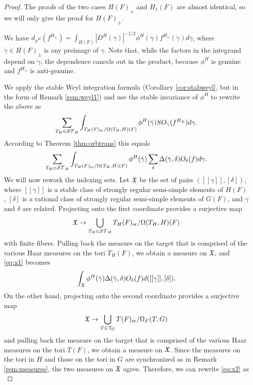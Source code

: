 \documentclass{article}
\theoremstyle{definition}
\numberwithin{equation}{section}
\renewcommand{\-}{\hyp{}}
\begin{document}
	\begin{proof}
	The proofs of the two cases $H(F)_\pm$ and $H_1(F)$ are almost identical, so we will only give the proof for $H(F)_\pm$.
	
	We have $d_{\phi^H}(f^{H_\pm}) = \int_{H(F)}|D^H(\gamma)|^{-1/2}\phi^H(\dot\gamma)f^{H_\pm}(\dot\gamma)d\gamma$, where $\dot\gamma \in H(F)_\pm$ is any preimage of $\gamma$. Note that, while the factors in the integrand depend on $\dot\gamma$, the dependence cancels out in the product, because $\phi^H$ is genuine and $f^{H_\pm}$ is anti-genuine.
	
	We apply the stable Weyl integration formula (Corollary \ref{cor:stabweyl}, but in the form of Remark \ref{rem:weyl1}) and use the stable invariance of $\phi^H$ to rewrite the above as
	\[ \sum_{T_H \in \mathcal{ST}_H} \int_{T_H(F)_{\textrm{sr}}/\Omega(T_H,H)(F)}\phi^H(\dot\gamma) SO_{\dot\gamma}(f^{H_\pm})d\gamma.\]
	According to Theorem \ref{thm:orbtrans} this equals
	\begin{equation} \label{eq:x1}
	\sum_{T_H \in \mathcal{ST}_H} \int_{T_H(F)_{\textrm{sr}}/\Omega(T_H,H)(F)}\phi^H(\dot\gamma)  \sum_\delta \Delta(\dot\gamma,\delta) O_\delta(f) d\gamma.
	\end{equation}
	We will now rework the indexing sets. Let $\mathfrak{X}$ be the set of pairs $([[\gamma]],[\delta])$, where $[[\gamma]]$ is a stable class of strongly regular semi-simple elements of $H(F)$, $[\delta]$ is a rational class of strongly regular semi-simple elements of $G(F)$, and $\gamma$ and $\delta$ are related. Projecting onto the first coordinate provides a surjective map
	\[ \mathfrak{X} \to \bigcup_{T_H \in \mathcal{ST}_H} T_H(F)_{\textrm{sr}}/\Omega(T_H,H)(F) \]
	with finite fibers. Pulling back the measure on the target that is comprised of the various Haar measures on the tori $T_H(F)$, we obtain a measure on $\mathfrak{X}$, and \eqref{eq:x1} becomes
	\begin{equation} \label{eq:x2}
	\int_{\mathfrak{X}} \phi^H(\dot\gamma) \Delta(\dot\gamma,\delta) O_\delta(f) d([[\gamma]],[\delta]).
	\end{equation}
	On the other hand, projecting onto the second coordinate provides a surjective map
	\[ \mathfrak{X} \to \bigcup_{T \in \mathcal{T}_G} T(F)_{\textrm{sr}}/\Omega_F(T,G) \]
	and pulling back the measure on the target that is comprised of the various Haar measures on the tori $T(F)$, we obtain a measure on $\mathfrak{X}$. Since the measures on the tori in $H$ and those on the tori in $G$ are synchronized as in Remark \ref{rem:measures}, the two measures on $\mathfrak{X}$ agree. Therefore, we can rewrite \eqref{eq:x2} as 
	\[ 
\]
\end{proof}
\end{document}
